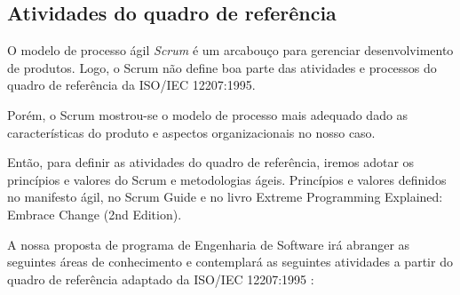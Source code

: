 \subsection{Atividades do quadro de referência}
O modelo de processo ágil \textit{Scrum} é um arcabouço para gerenciar desenvolvimento de produtos. Logo, o Scrum não define boa parte das atividades e processos do quadro de referência da ISO/IEC 12207:1995. 

Porém, o Scrum mostrou-se o modelo de processo mais adequado dado as características do produto e aspectos organizacionais no nosso caso. 

Então, para definir as atividades do quadro de referência, iremos adotar os princípios e valores do Scrum e metodologias ágeis. Princípios e valores definidos no manifesto ágil\cite{beck2001agile}, no Scrum Guide\cite{Schw01a} e no livro Extreme Programming Explained: Embrace Change (2nd Edition)\cite{BecAnd04extreme}.

A nossa proposta de programa de Engenharia de Software irá abranger as seguintes áreas de conhecimento e contemplará as seguintes atividades a partir do quadro de referência adaptado da ISO/IEC 12207:1995 \cite{iso12207:95}:

